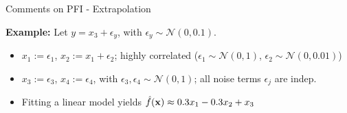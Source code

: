 \documentclass[10pt,compress,t,notes=noshow, xcolor=table]{beamer}
\begin{document}
\begin{frame}{Comments on PFI - Extrapolation}
 
 



\textbf{Example:} Let $y = x_3 + \epsilon_y$, with $\epsilon_y \sim \mathcal{N}(0, 0.1)$.

\begin{itemize}
  \item $x_1 := \epsilon_1$, $x_2 := x_1 + \epsilon_2$; highly correlated  
        ($\epsilon_1 \sim \mathcal{N}(0,1)$, $\epsilon_2 \sim \mathcal{N}(0, 0.01)$)
  \item $x_3 := \epsilon_3$, $x_4 := \epsilon_4$, with $\epsilon_3, \epsilon_4 \sim \mathcal{N}(0,1)$; all noise terms $\epsilon_j$ are indep.
  \item Fitting a linear model yields $\hat{f}(\mathbf{x}) \approx 0.3 x_1 - 0.3 x_2 + x_3$
\end{itemize}


\end{frame}
\end{document}
